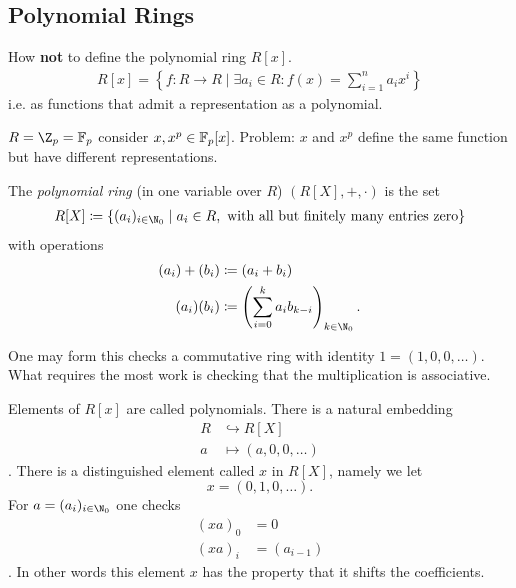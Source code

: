 \documentclass[master.tex]{subfiles}
\begin{document}
  \subsection{Polynomial Rings}
  How \textbf{not} to define the polynomial ring \(R[x]\).
  \begin{align*}
    R[x] = \left\{f \colon R \to R \mid \exists a_{i} \in R : f(x)=\sum_{i=1}^na_ix^i\right\}
  \end{align*}
  i.e. as functions that admit a representation as a polynomial.
  \begin{example}
    \(R = \Z_p = \F_p\) consider \(x, x^p \in \mathbb{F}_p[x]\). Problem: \(x\) and \(x^p\) define the same function but have
    different representations.
  \end{example}

  \begin{defn}
    The \emph{polynomial ring} (in one variable over \(R\)) \((R[X],+,\cdot)\) is the set
    \begin{align*}
      R[X] \coloneqq \left\{(a_i)_{i \in \N_0} \mid a_i \in R, \text{ with all but finitely many entries zero}\right\}
    \end{align*}
    with operations
    \begin{align*}
      (a_i) + (b_i) &\coloneqq (a_i + b_i)\\
      (a_i)(b_i) &\coloneqq \left(\sum_{i=0}^k a_ib_{k-i}\right)_{k \in \N_0}.
    \end{align*}
  \end{defn}
  One may form this checks a commutative ring with identity \(1=(1,0,0,\ldots)\). What requires the most work is
  checking that the multiplication is associative.
  \begin{rmk*}
    Elements of \(R[x]\) are called polynomials. There is a natural embedding
    \begin{align*}
      R &\hookrightarrow R[X]\\
      a &\mapsto (a,0,0,\ldots)
    \end{align*}.
    There is a distinguished element called \(x\) in \(R[X]\), namely we let
    \[x = (0,1,0,\ldots).\] For \(a=(a_i)_{i \in \N_0}\) one checks
    \begin{align*}
      (xa)_0 &= 0\\
      (xa)_i &= (a_{i-1})
    \end{align*}.
    In other words this element \(x\) has the property that it shifts the coefficients.
  \end{rmk*}
\end{document}

